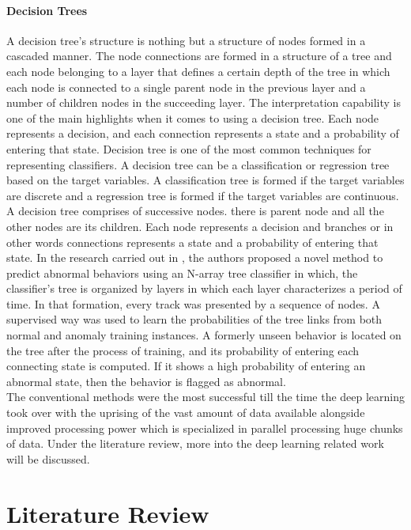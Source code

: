 \documentclass[a4paper,12pt]{report}
\begin{document}
\begin{itemize}
\subsubsection{Decision Trees}
A decision tree's structure is nothing but a structure of nodes formed in a cascaded manner. The node connections are formed in a structure of a tree and each node belonging to a layer that defines a certain depth of the tree in which each node is connected to a single parent node in the previous layer and a number of children nodes in the succeeding layer. The interpretation capability is one of the main highlights when it comes to using a decision tree. Each node represents a decision, and each connection represents a state and a probability of entering that state. Decision tree is one of the most common techniques for representing classifiers. A decision tree can be a classification or regression tree based on the target variables. A classification tree is formed if the target variables are discrete and a regression tree is formed if the target variables are continuous. A decision tree comprises of successive nodes. there is  parent node and all the other nodes are its children. Each node represents a decision and branches or in other words connections represents a state and a probability of entering that state.
In the research carried out in \cite{127}, the authors proposed a novel method to predict abnormal behaviors using an N-array tree classifier in which, the classifier's tree is organized by layers in which each layer characterizes a period of time. In that formation, every track was presented by a sequence of nodes. A supervised way was used to learn the probabilities of the tree links from both normal and anomaly training instances. A formerly unseen behavior is located on the tree after the process of training, and its probability of entering each connecting state is computed. If it shows  a high probability of entering an abnormal state, then the behavior is flagged as abnormal. \\

The conventional methods were the most successful till the time the deep learning took over with the uprising of the vast amount of data available alongside improved processing power which is specialized in parallel processing huge chunks of data. Under the literature review, more into the deep learning related work will be discussed. 


\chapter{Literature Review}
\newpage


\end{itemize}
\end{document}
